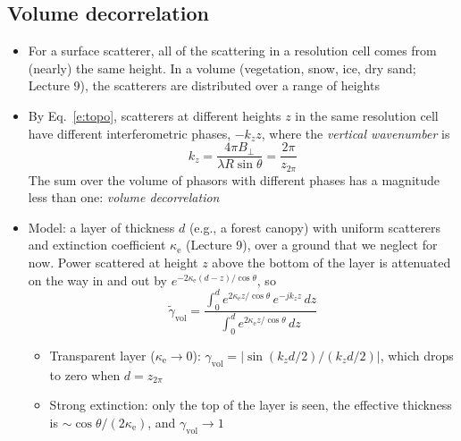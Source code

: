 \documentclass[11pt, oneside]{article}
\newcommand{\Bperp}{B_\perp}
\newcommand{\zamb}{z_{2\pi}}
\newcommand{\gt}{\tilde{\gamma}}
\begin{document}
\subsection{Volume decorrelation}

\begin{itemize}
	\item For a surface scatterer, all of the scattering in a resolution cell comes from (nearly) the same height. In a volume (vegetation, snow, ice, dry sand; Lecture 9), the scatterers are distributed over a range of heights
	\item By Eq.~\eqref{e:topo}, scatterers at different heights $z$ in the same resolution cell have different interferometric phases, $-k_zz$, where the \emph{vertical wavenumber} is
	\begin{equation}
		\label{e:kz}
		k_z = \frac{4\pi\Bperp}{\lambda R\sin\theta} = \frac{2\pi}{\zamb}
	\end{equation}
	The sum over the volume of phasors with different phases has a magnitude less than one: \emph{volume decorrelation}
	\item Model: a layer of thickness $d$ (e.g., a forest canopy) with uniform scatterers and extinction coefficient $\kappa_\mathrm{e}$ (Lecture 9), over a ground that we neglect for now. Power scattered at height $z$ above the bottom of the layer is attenuated on the way in and out by $e^{-2\kappa_\mathrm{e}(d - z)/\cos\theta}$, so
	\begin{equation}
		\label{e:gvol}
		\gt_\mathrm{vol} = \frac{\int_0^d e^{2\kappa_\mathrm{e}z/\cos\theta}\,e^{-jk_zz}\,dz}{\int_0^d e^{2\kappa_\mathrm{e}z/\cos\theta}\,dz}
	\end{equation}
	\begin{itemize}
		\item Transparent layer ($\kappa_\mathrm{e} \to 0$): $\gamma_\mathrm{vol} = |\sin(k_zd/2)/(k_zd/2)|$, which drops to zero when $d = \zamb$
		\item Strong extinction: only the top of the layer is seen, the effective thickness is $\sim$$\cos\theta/(2\kappa_\mathrm{e})$, and $\gamma_\mathrm{vol} \to 1$
$$
\end{itemize}
\end{itemize}
\end{document}
